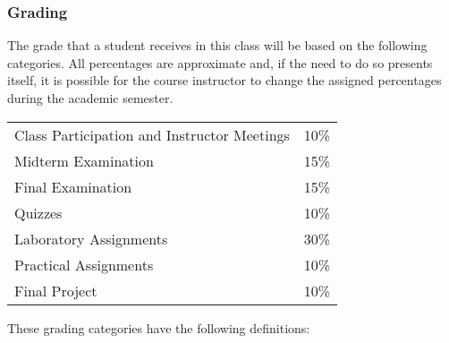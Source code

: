 \subsubsection*{Grading}

The grade that a student receives in this class will be based on the following categories. All percentages are
approximate and, if the need to do so presents itself, it is possible for the course instructor to change the assigned
percentages during the academic semester.

\begin{center}
  \begin{tabular}{ll}
    Class Participation and Instructor Meetings & 10\% \\
    Midterm Examination                         & 15\% \\
    Final Examination                           & 15\% \\
    Quizzes                                     & 10\% \\
    Laboratory Assignments                      & 30\% \\
    Practical Assignments                       & 10\% \\
    Final Project                               & 10\%
  \end{tabular}
\end{center}

\noindent
These grading categories have the following definitions:
\vspace*{-.1in}

